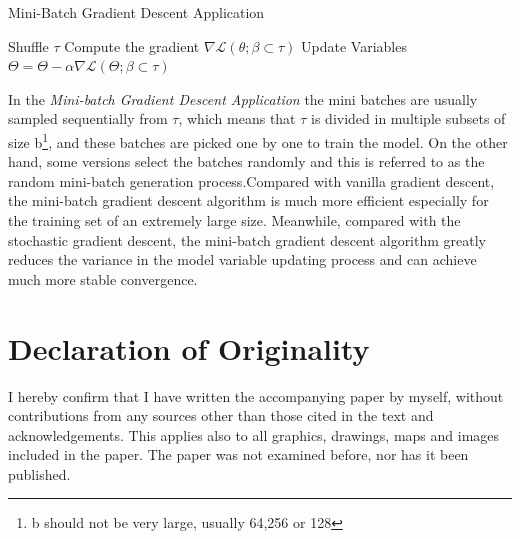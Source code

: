\documentclass[conference]{IEEEtran}
\begin{document}
\begin{algorithm}
\caption{Mini-Batch Gradient Descent Application}\label{MBGDA}
\begin{algorithmic}[1]
\State Shuffle $\tau$
\State Compute the gradient $\nabla\mathscr{L}(\theta;\beta \subset \tau)$
\State Update Variables $\Theta = \Theta -\alpha\nabla\mathscr{L}(\Theta;\beta \subset \tau)$
\EndFor
\EndFor
{}
\end{algorithmic}
\end{algorithm}
In the \textit{Mini-batch Gradient Descent Application} the mini batches are usually sampled sequentially from $\tau$, which means that $\tau$ is divided in multiple subsets of size b\footnote{b should not be very large, usually 64,256 or 128}, and these batches are picked one by one to train the model. On the other hand, some versions select the batches randomly and this is referred to as the random mini-batch generation process.Compared with vanilla gradient descent, the mini-batch gradient descent algorithm is much more efficient especially for the training set of an extremely large size. Meanwhile, compared with the stochastic gradient descent, the mini-batch gradient descent algorithm greatly reduces the variance in the model variable updating process and can achieve much more stable convergence.\cite{JZ2019}




\newpage
\section{Declaration of Originality}
I hereby confirm that I have written the accompanying paper by myself, without contributions from any sources other than those cited in the text and acknowledgements.
This applies also to all graphics, drawings, maps and images included in the paper.
The paper was not examined before, nor has it been published.


 
\end{document}
